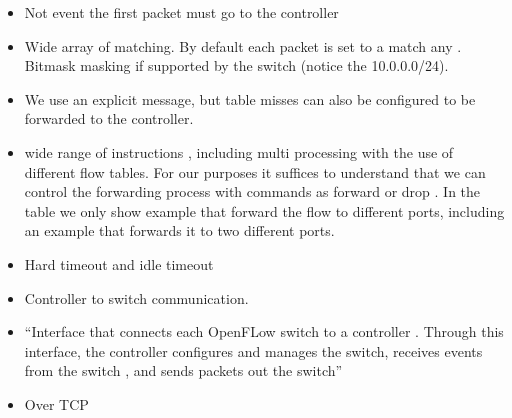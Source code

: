 \documentclass[12pt,openright,twoside]{report}
\begin{document}
\begin{itemize}
\begin{itemize}
\item Not event the first packet must go to the controller
\item Wide array of matching. By default each packet is set to a match any . Bitmask masking if supported by the switch (notice the 10.0.0.0/24). 
\item We use an explicit message, but table misses can also be configured to be forwarded to the controller. 
\item wide range of instructions , including multi processing with the use of different flow tables. For our purposes it suffices to understand that we can control the forwarding process with commands as  forward or drop . In the table we only show example that forward the flow to different ports, including an example that forwards it to two different ports. 
\item Hard timeout and idle timeout

\end{itemize}

\begin{itemize}
\item Controller to switch communication. 
\item ``Interface that connects each OpenFLow switch to a controller .  Through this interface, the controller configures and manages the switch, receives events from the switch , and sends packets out the switch'' 
\item Over TCP 


\end{itemize}
\end{itemize}
\end{document}
